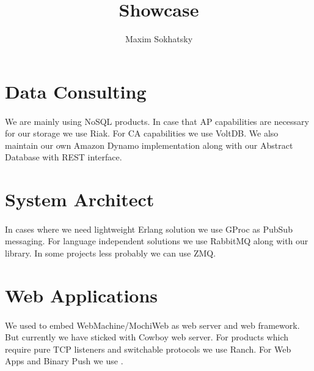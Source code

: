 \documentclass[11pt]{article}
\begin{document}
\title{Showcase}
\author{Maxim Sokhatsky}


\section*{Data Consulting}
\paragraph{}
    We are mainly using NoSQL products. In case that AP capabilities are necessary
    for our storage we use Riak. For CA capabilities we use VoltDB.
    We also maintain our own Amazon Dynamo implementation
      along with our
     Abstract Database with REST interface.

\section*{System Architect}
\paragraph{}
    In cases where we need lightweight Erlang solution we use GProc as PubSub messaging.
    For language independent solutions we use RabbitMQ along with our  library.
    In some projects less probably we can use ZMQ.

\section*{Web Applications}
\paragraph{}
    We used to embed WebMachine/MochiWeb as web server and web framework.
    But currently we have sticked with Cowboy web server.
    For products which require pure TCP listeners and switchable protocols we use Ranch.
    For Web Apps and Binary Push we use .
\end{document}
